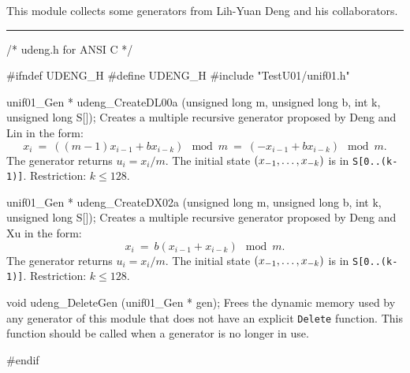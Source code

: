 
This module collects some generators from Lih-Yuan Deng and his
 collaborators.%



\bigskip
\hrule
\code\hide
/* udeng.h for ANSI C */

#ifndef UDENG_H
#define UDENG_H
\endhide
#include "TestU01/unif01.h"
\endcode
\code


unif01_Gen * udeng_CreateDL00a (unsigned long m, unsigned long b, int k,
                                unsigned long S[]);
\endcode
  \tab Creates a multiple recursive generator proposed by Deng
   and Lin \cite{rDEN00a} in the form:
   $$
     x_i\ =\ ((m-1)x_{i-1} + b x_{i-k}) \mod m\ =\
           (-x_{i-1} + b x_{i-k}) \mod m.
   $$
   The generator returns $u_i = x_i/m$. The initial state
   $(x_{-1},\dots,\?x_{-k})$ is in {\tt S[0..(k-1)]}.
   Restriction: $k \le 128$.
 \endtab
\code


unif01_Gen * udeng_CreateDX02a (unsigned long m, unsigned long b, int k,
                                unsigned long S[]);
\endcode
  \tab Creates a multiple recursive generator proposed by Deng
   and Xu \cite{rDEN02a} in the form:
   $$
     x_i \ =\ b(x_{i-1} + x_{i-k}) \mod m.
   $$
   The generator returns $u_i = x_i/m$. The initial state
   $(x_{-1},\dots,\?x_{-k})$ is in {\tt S[0..(k-1)]}.
   Restriction: $k \le 128$.
 \endtab






\code


void udeng_DeleteGen (unif01_Gen * gen);
\endcode
  \tab Frees the dynamic memory used by any generator of this module
  that does not have an explicit {\tt Delete} function.
  This function should be called when a generator
  is no longer in use.
 \endtab

\code
\hide
#endif
\endhide
\endcode
